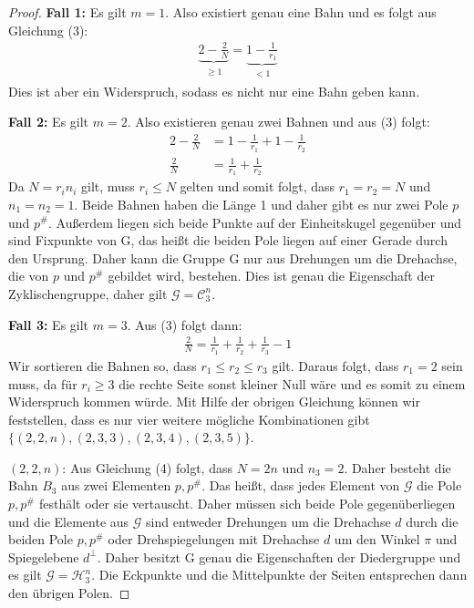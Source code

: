 \begin{proof}
	\textbf{Fall 1:} Es gilt $m=1$. Also existiert genau eine Bahn und es folgt aus Gleichung (3):
	\begin{align*}
	\underbrace{2-\frac{2}{N}}_{\substack{\geq 1}} = \underbrace{1-\frac{1}{r_1}}_{\substack{<1}}
	\end{align*}
	Dies ist aber ein Widerspruch, sodass es nicht nur eine Bahn geben kann.
	
	\textbf{Fall 2:} Es gilt $m=2$. Also existieren genau zwei Bahnen und aus (3) folgt:
	\begin{align*}
	2-\frac{2}{N} &= 1-\frac{1}{r_1} + 1-\frac{1}{r_2} \\
	\frac{2}{N} &= \frac{1}{r_1} + \frac{1}{r_2}
	\end{align*}
	Da $N=r_i n_i$ gilt, muss $r_i \leq N$ gelten und somit folgt, dass $r_1 = r_2 = N$ und $n_1 = n_2 = 1$. Beide Bahnen haben die Länge 1 und daher gibt es nur zwei Pole $p$ und $p^{\#}$. Außerdem liegen sich beide Punkte auf der Einheitskugel gegenüber und sind Fixpunkte von G, das heißt die beiden Pole liegen auf einer Gerade durch den Ursprung. Daher kann die Gruppe G nur aus Drehungen um die Drehachse, die von $p$ und $p^{\#}$ gebildet wird, bestehen. Dies ist genau die Eigenschaft der Zyklischengruppe, daher gilt $\mathcal{G}=\mathcal{C}_3^n$.
	
	\textbf{Fall 3:} Es gilt $m=3$. Aus (3) folgt dann:
	\begin{align}
	\frac{2}{N} = \frac{1}{r_1} + \frac{1}{r_2} + \frac{1}{r_3} - 1
	\end{align}
	Wir sortieren die Bahnen so, dass $r_1 \leq r_2 \leq r_3$ gilt. Daraus folgt, dass $r_1 = 2$ sein muss, da für $r_i \geq 3$ die rechte Seite sonst kleiner Null wäre und es somit zu einem Widerspruch kommen würde. Mit Hilfe der obrigen Gleichung können wir feststellen, dass es nur vier weitere mögliche Kombinationen gibt $\{(2,2,n),(2,3,3),(2,3,4),(2,3,5)\}$.
	
	
	$(2,2,n)$: Aus Gleichung (4) folgt, dass $N = 2n$ und $n_3=2$. Daher besteht die Bahn $B_3$ aus zwei Elementen $p, p^{\#}$. Das heißt, dass jedes Element von $\mathcal{G}$ die Pole $p,p^{\#}$ festhält oder sie vertauscht. Daher müssen sich beide Pole gegenüberliegen und die Elemente aus $\mathcal{G}$ sind entweder Drehungen um die Drehachse $d$ durch die beiden Pole $p,p^{\#}$ oder Drehspiegelungen mit Drehachse $d$ um den Winkel $\pi$ und Spiegelebene $d^{\perp}$. Daher besitzt G genau die Eigenschaften der Diedergruppe und es gilt $\mathcal{G} = \mathcal{H}_3^n$. Die Eckpunkte und die Mittelpunkte der Seiten entsprechen dann den übrigen Polen. 
	

\end{proof}
